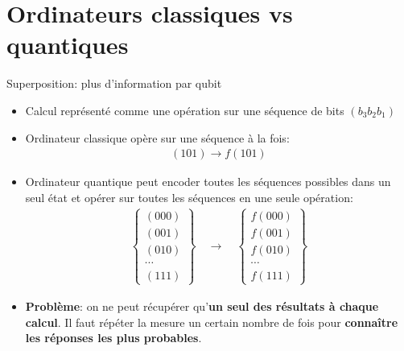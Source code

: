 \documentclass[aspectratio=169,12pt]{beamer}
\begin{document}
\section{Ordinateurs classiques vs quantiques}

\begin{frame}{Superposition: plus d'information par qubit}
    \begin{itemize}[<+->]
        \item Calcul représenté comme une opération sur une séquence de bits $(b_3 b_2 b_1)$
        \item Ordinateur classique opère sur une séquence à la fois:
        \begin{align*}
            (101) \longrightarrow f(101)
        \end{align*}
        \item Ordinateur quantique peut encoder toutes les séquences possibles dans un seul état et opérer sur toutes les séquences en une seule opération:
        \begin{align*}
            \begin{Bmatrix}
                (000) \\ (001) \\ (010) \\ \cdots \\ (111)
            \end{Bmatrix}
            \quad \longrightarrow \quad
            \begin{Bmatrix}
                f(000) \\ f(001) \\ f(010) \\ \cdots \\ f(111)
            \end{Bmatrix}
        \end{align*}
        \item \textbf{Problème}: on ne peut récupérer qu'\textbf{un seul des résultats à chaque calcul}. Il faut répéter la mesure un certain nombre de fois pour \textbf{connaître les réponses les plus probables}.
    \end{itemize}
\end{frame}
\end{document}
